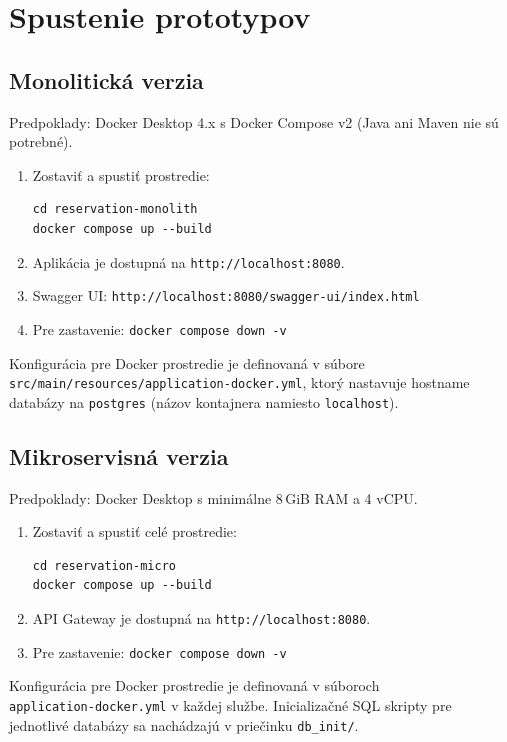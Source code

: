 \section{Spustenie prototypov}

\subsection*{Monolitická verzia}

Predpoklady: Docker Desktop 4.x s Docker Compose v2 (Java ani Maven nie sú potrebné).

\begin{enumerate}
    \item Zostaviť a spustiť prostredie:
\begin{verbatim}
cd reservation-monolith
docker compose up --build
\end{verbatim}
    \item Aplikácia je dostupná na \texttt{http://localhost:8080}.
    \item Swagger UI: \texttt{http://localhost:8080/swagger-ui/index.html}
    \item Pre zastavenie: \texttt{docker compose down -v}
\end{enumerate}

Konfigurácia pre Docker prostredie je definovaná v súbore \\ \texttt{src/main/resources/application-docker.yml}, ktorý nastavuje hostname databázy na \texttt{postgres} (názov kontajnera namiesto \texttt{localhost}).

\subsection*{Mikroservisná verzia}

Predpoklady: Docker Desktop s minimálne 8\,GiB RAM a 4 vCPU.

\begin{enumerate}
    \item Zostaviť a spustiť celé prostredie:
\begin{verbatim}
cd reservation-micro
docker compose up --build
\end{verbatim}
    \item API Gateway je dostupná na \texttt{http://localhost:8080}.
    \item Pre zastavenie: \texttt{docker compose down -v}
\end{enumerate}

Konfigurácia pre Docker prostredie je definovaná v súboroch \\ \texttt{application-docker.yml} v každej službe. Inicializačné SQL skripty pre jednotlivé databázy sa nachádzajú v priečinku \texttt{db\_init/}.

